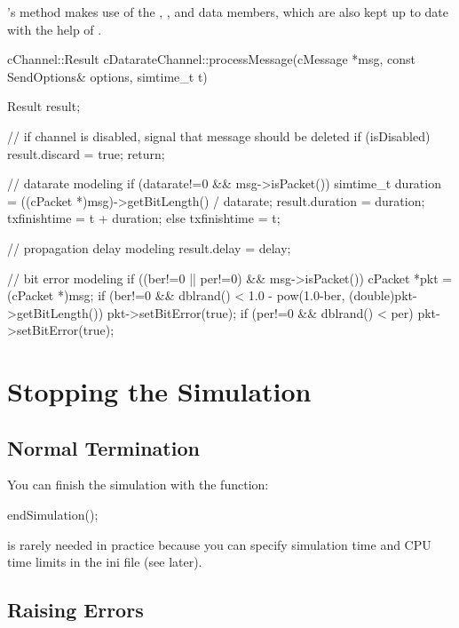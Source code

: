 's  method makes use of
the , ,  and  data
members, which are also kept up to date with the help of
.

\begin{cpp}
cChannel::Result cDatarateChannel::processMessage(cMessage *msg,
                    const SendOptions& options, simtime_t t)
{
    Result result;

    // if channel is disabled, signal that message should be deleted
    if (isDisabled) {
        result.discard = true;
        return;
    }

    // datarate modeling
    if (datarate!=0 && msg->isPacket()) {
        simtime_t duration = ((cPacket *)msg)->getBitLength() / datarate;
        result.duration = duration;
        txfinishtime = t + duration;
    }
    else {
        txfinishtime = t;
    }

    // propagation delay modeling
    result.delay = delay;

    // bit error modeling
    if ((ber!=0 || per!=0) && msg->isPacket()) {
        cPacket *pkt = (cPacket *)msg;
        if (ber!=0 && dblrand() < 1.0 - pow(1.0-ber, (double)pkt->getBitLength())
            pkt->setBitError(true);
        if (per!=0 && dblrand() < per)
            pkt->setBitError(true);
    }
}
\end{cpp}



\section{Stopping the Simulation}
\label{sec:simple-modules:stopping}

\subsection{Normal Termination}
\label{sec:simple-modules:endsimulation}

You can finish the simulation with the  function:

\begin{cpp}
endSimulation();
\end{cpp}

 is rarely needed in practice because you
can specify simulation time and CPU time limits
in the ini file (see later).

\subsection{Raising Errors}
\label{sec:simple-modules:raising-errors}

